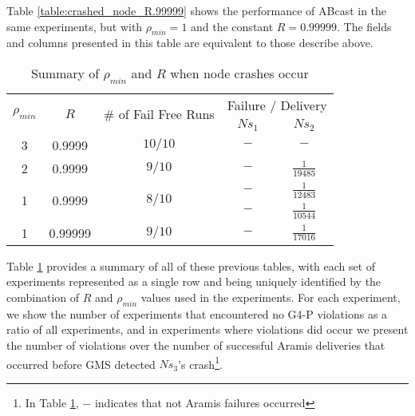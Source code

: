     Table \ref{table:crashed_node_R.99999} shows the performance of \textsf{ABcast} in the same experiments, but with $\rho_{min} = 1$ and the constant $R = 0.99999$.  The fields and columns presented in this table are equivalent to those describe above.  
    
    \begin{table}[h]
  \begin{center}
  \renewcommand{\arraystretch}{1.5}
    \begin{tabular}{|c|c|c|c|c|}
    \hline
    \multirow{2}{*}{$\rho_{min}$} & \multirow{2}{*}{$R$}    & \multirow{2}{1.75cm}{$\#$ of Fail Free Runs} & \multicolumn{2}{|c|}{Failure / Delivery} \\ \cline{4-5}
                                 &              &                   & $Ns_1$   & $Ns_2$             \\ \hline \hline
    3                           & 0.9999  & $10/10$    & $-$        & $-$                 \\ \hline
    2                           & 0.9999  & $9/10$      & $-$        & $\frac{1}{19485}$ \\ \hline
    \multirow{2}{*}{1} & \multirow{2}{*}{0.9999} & \multirow{2}{*}{$8/10$} & $-$ & $\frac{1}{12483}$ \\ 
                                 &              &                   & $-$        & $\frac{1}{10544}$ \\ \hline
    1                           &0.99999 & $9/10$      & $-$        & $\frac{1}{17016}$ \\ \hline
    \end{tabular}
    \caption{Summary of $\rho_{min}$ and $R$ when node crashes occur}
    \label{table:crashed_node_summary}
  \end{center}
\end{table}    
    
    Table \ref{table:crashed_node_summary} provides a summary of all of these previous tables, with each set of experiments represented as a single row and being uniquely identified by the combination of $R$ and $\rho_{min}$ values used in the experiments.  For each experiment, we show the number of experiments that encountered no G4-P violations as a ratio of all experiments, and in experiments where violations did occur we present the number of violations over the number of successful \textsf{Aramis} deliveries that occurred before GMS detected $Ns_3$'s crash\footnote{In Table \ref{table:crashed_node_summary}, $-$ indicates that not \textsf{Aramis} failures occurred}.  
     
